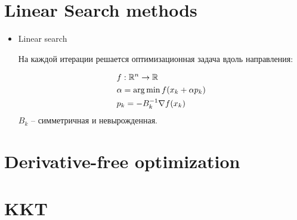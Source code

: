 \section{Linear Search methods}

\begin{frame}
  \begin{itemize}
    \item Linear search

      На каждой итерации решается оптимизационная задача вдоль направления:

      \begin{align*}
        & f : \mathbb{R}^n \rightarrow  \mathbb{R} \\
        & \alpha = \operatorname*{arg\,min} f(x_k + \alpha p_k)  \\
        & p_k = - B_{k}^{-1} \nabla f(x_k) 
      \end{align*}
    $B_k$ -- симметричная и невырожденная.
  \end{itemize}
\end{frame}















\section{Derivative-free optimization}



\section{KKT}


